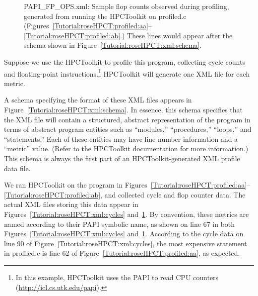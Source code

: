 \begin{figure}[!h]
{\indent
{\mySmallFontSize
\begin{latexonly}
   
\end{latexonly}

\begin{htmlonly}
   
\end{htmlonly}

}
}
\caption{PAPI\_FP\_OPS.xml: Sample flop counts observed during
profiling, generated from running the HPCToolkit on profiled.c
(Figures~\ref{Tutorial:roseHPCT:profiled:aa}--\ref{Tutorial:roseHPCT:profiled:ab}.)
These lines would appear after the schema shown in
Figure~\ref{Tutorial:roseHPCT:xml:schema}.}
\label{Tutorial:roseHPCT:xml:flops}
\end{figure}

Suppose we use the HPCToolkit to profile this program, collecting
cycle counts and floating-point instructions.\footnote{In this
example, HPCToolkit uses the PAPI to read CPU counters
(\url{http://icl.cs.utk.edu/papi}).} HPCToolkit will generate one XML
file for each metric.

A schema specifying the format of these XML files appears in
Figure~\ref{Tutorial:roseHPCT:xml:schema}. In essence, this schema
specifies that the XML file will contain a structured, abstract
representation of the program in terms of abstract program entities
such as ``modules,'' ``procedures,'' ``loops,'' and ``statements.''
Each of these entities may have line number information and a
``metric'' value. (Refer to the HPCToolkit documentation for more
information.) This schema is always the first part of an
HPCToolkit-generated XML profile data file.

We ran HPCToolkit on the program in
Figures~\ref{Tutorial:roseHPCT:profiled:aa}--\ref{Tutorial:roseHPCT:profiled:ab},
and collected cycle and flop counter data. The actual XML files
storing this data appear in Figures~\ref{Tutorial:roseHPCT:xml:cycles}
and~\ref{Tutorial:roseHPCT:xml:flops}. By convention, these metrics
are named according to their PAPI symbolic name, as shown on line 67
in both Figures~\ref{Tutorial:roseHPCT:xml:cycles}
and~\ref{Tutorial:roseHPCT:xml:flops}. According to the cycle data on
line 90 of Figure~\ref{Tutorial:roseHPCT:xml:cycles}, the most
expensive statement in profiled.c is line 62 of
Figure~\ref{Tutorial:roseHPCT:profiled:aa}, as expected.

